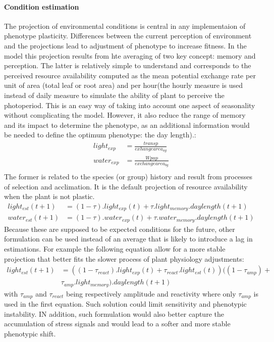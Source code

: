 \paragraph{Condition estimation} The projection of environmental conditions is central in any implementaion of phenotype plasticity. Differences between the current perception of environment and the projections lead to adjustment of phenotype to increase fitness. In the model \model this projection results from hte averaging of two key concept: memory and perception. The latter is relatively simple to understand and corresponds to the perceived resource availability computed as the mean potential exchange rate per unit of area (total leaf or root area) and per hour(the hourly measure is used instead of daily measure to simulate the ability of plant to perceive the photoperiod. This is an easy way of taking into account one aspect of seasonality without complicating the model. However, it also reduce the range of memory and its impact to determine the phenotype, as an additional information would be needed to define the optimum phenotype: the day length).:
\begin{align}
light_{exp} &= \frac{transp}{exhange area_{ag}}\\
water_{exp} &= \frac{Wpup}{exchange area_{bg}}\\
\end{align}
The former is related to the species (or group) history and result from processes of selection and acclimation. It is the default projection of resource availability when the plant is not plastic. 
\begin{align}
light_{est}(t+1) &= (1 - \tau).light_{exp}(t) + \tau . light_{memory} . daylength(t+1)\\
water_{est}(t+1) &= (1 - \tau).water_{exp}(t) + \tau . water_{memory} . daylength(t+1)
\end{align}
\indent Because these are supposed to be expected conditions for the future, other formulation can be used instead of an average that is likely to introduce a lag in estimations. For example the following equation allow for a more stable projection that better fits the slower process of plant physiology adjustments:
\begin{align}\label{eq:projection_alt}
light_{est}(t+1) &= ((1 - \tau_{react}).light_{exp}(t) + \tau_{react} . light_{est}(t))((1 - \tau_{amp}) +\\
 & \tau_{amp} . light_{memory}) . daylength(t+1)
\end{align}
with $\tau_{amp}$ and $\tau_{react}$ being respectively amplitude and reactivity where only $\tau_{amp}$ is used in the first equation. Such solution could limit sensitivity and phenotypic instability. IN addition, such formulation would also better capture the accumulation of stress signals and would lead to a softer and more stable phenotypic shift.\\
